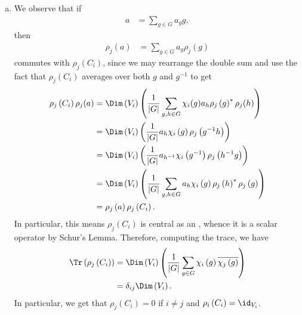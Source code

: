 \documentclass[10pt]{mypackage}
\begin{document}
\begin{solution}\hfill
  \begin{enumerate}[(a)]
    \item We observe that if
      \begin{align*}
        a &= \sum_{g\in G}a_g g,
      \end{align*}
      then
      \begin{align*}
        \rho_j(a) &= \sum_{g\in G}a_g \rho_j(g)
      \end{align*}
      commutes with $\rho_j\left( C_i \right)$, since we may rearrange the double sum and use the fact that $\rho_j\left( C_i \right)$ averages over both $g$ and $g^{-1}$ to get
      \begin{align*}
        \rho_j\left( C_i \right)\rho_j(a) &= \Dim\left( V_i \right) \left( \frac{1}{\left\vert G \right\vert}\sum_{g,h\in G}\chi_i(g)a_h\rho_j\left( g \right)^{\ast}\rho_j(h) \right)\\
                                          &= \Dim\left( V_i \right)\left( \frac{1}{\left\vert G \right\vert}a_h\chi_i\left( g \right)\rho_j\left( g^{-1}h \right) \right)\\
                                          &= \Dim\left( V_i \right) \left( \frac{1}{\left\vert G \right\vert}a_{h^{-1}}\chi_i\left( g^{-1} \right) \rho_j\left( h^{-1}g \right) \right)\\
                                          &= \Dim\left( V_i \right)\left( \frac{1}{\left\vert G \right\vert}\sum_{g,h\in G} a_h\chi_i\left( g \right)\rho_j\left( h \right)^{\ast}\rho_j\left( g \right) \right)\\
                                          &= \rho_j\left( a \right)\rho_j\left( C_i \right).
      \end{align*}
      In particular, this means $\rho_j\left( C_i \right)$ is central as an , whence it is a scalar operator by Schur's Lemma. Therefore, computing the trace, we have
      \begin{align*}
        \Tr\left( \rho_j\left( C_i \right) \right) &= \Dim\left( V_i \right) \left( \frac{1}{\left\vert G \right\vert} \sum_{g\in G}\chi_i\left( g \right) \overline{\chi_j\left( g \right)} \right)\\
                                                   &= \delta_{ij}\Dim\left( V_i \right).
      \end{align*}
      In particular, we get that $\rho_j\left( C_i \right) = 0$ if $i\neq j$ and $\rho_i\left( C_i \right) = \id_{V_i}$.
  \end{enumerate}
\end{solution}
\end{document}
